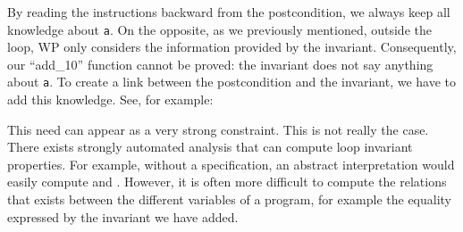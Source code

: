 By reading the instructions backward
from the postcondition, we always keep all knowledge about \texttt{a}. On
the opposite, as we previously mentioned, outside the loop, WP only
considers the information provided by the invariant. Consequently, our
``add\_10'' function cannot be proved: the invariant does not say anything
about \texttt{a}. To create a link between the postcondition and the
invariant, we have to add this knowledge. See, for example:






\begin{Information}
  This need can appear as a very strong constraint. This is not really the
  case. There exists strongly automated analysis that can compute loop
  invariant properties. For example, without a specification, an abstract
  interpretation would easily compute 
  and .
  However, it is often more difficult to compute the relations
  that exists between the different variables of a program, for
  example the equality expressed by the invariant we have
  added.
\end{Information}
